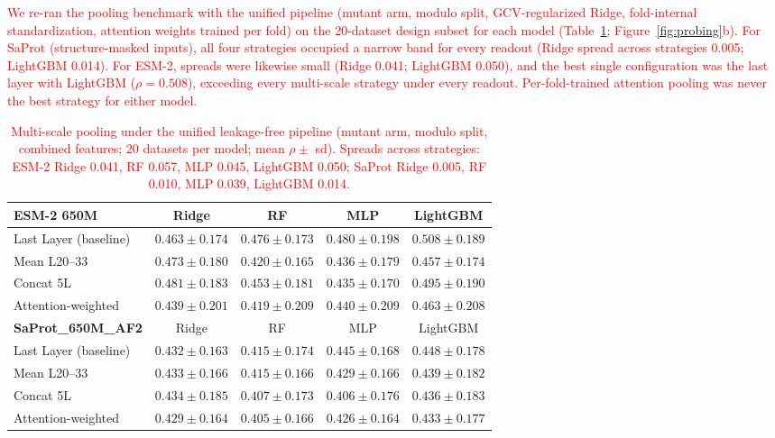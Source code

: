 \documentclass[numbered,webpdf,modern,large]{oup-authoring-template}
\newcommand{\rev}[1]{\textcolor{red}{#1}}
\begin{document}
\rev{We re-ran the pooling benchmark with the unified pipeline (mutant arm, modulo
split, GCV-regularized Ridge, fold-internal standardization, attention weights trained
per fold) on the 20-dataset design subset for each model
(Table~\ref{tab:pooling}; Figure~\ref{fig:probing}b).
For SaProt (structure-masked inputs), all four strategies occupied a narrow band for
every readout (Ridge spread across strategies 0.005; LightGBM 0.014). For ESM-2,
spreads were likewise small (Ridge 0.041; LightGBM 0.050), and the best single
configuration was the last layer with LightGBM ($\rho = 0.508$), exceeding every
multi-scale strategy under every readout. Per-fold-trained attention pooling was
never the best strategy for either model.}

\begin{table}[ht]
\centering
\caption{\rev{Multi-scale pooling under the unified leakage-free pipeline (mutant
arm, modulo split, combined features; 20 datasets per model; mean $\rho \pm$ sd).
Spreads across strategies: ESM-2 Ridge 0.041, RF 0.057, MLP 0.045, LightGBM 0.050;
SaProt Ridge 0.005, RF 0.010, MLP 0.039, LightGBM 0.014.}}
\label{tab:pooling}
\begin{tabular}{lcccc}
\toprule
\textbf{ESM-2 650M} & Ridge & RF & MLP & LightGBM \\
\midrule
Last Layer (baseline) & $0.463 \pm 0.174$ & $0.476 \pm 0.173$ & $0.480 \pm 0.198$ & $\mathbf{0.508} \pm 0.189$ \\
Mean L20--33          & $0.473 \pm 0.180$ & $0.420 \pm 0.165$ & $0.436 \pm 0.179$ & $0.457 \pm 0.174$ \\
Concat 5L             & $0.481 \pm 0.183$ & $0.453 \pm 0.181$ & $0.435 \pm 0.170$ & $0.495 \pm 0.190$ \\
Attention-weighted    & $0.439 \pm 0.201$ & $0.419 \pm 0.209$ & $0.440 \pm 0.209$ & $0.463 \pm 0.208$ \\
\midrule
\textbf{SaProt\_650M\_AF2} & Ridge & RF & MLP & LightGBM \\
\midrule
Last Layer (baseline) & $0.432 \pm 0.163$ & $0.415 \pm 0.174$ & $0.445 \pm 0.168$ & $\mathbf{0.448} \pm 0.178$ \\
Mean L20--33          & $0.433 \pm 0.166$ & $0.415 \pm 0.166$ & $0.429 \pm 0.166$ & $0.439 \pm 0.182$ \\
Concat 5L             & $0.434 \pm 0.185$ & $0.407 \pm 0.173$ & $0.406 \pm 0.176$ & $0.436 \pm 0.183$ \\
Attention-weighted    & $0.429 \pm 0.164$ & $0.405 \pm 0.166$ & $0.426 \pm 0.164$ & $0.433 \pm 0.177$ \\
\bottomrule
\end{tabular}
\end{table}
\end{document}

